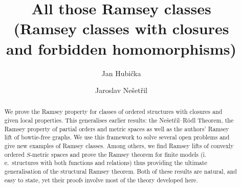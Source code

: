 \documentclass{elsarticle}
\newcommand{\ie}{i.\,e.}
\theoremstyle{plain}
\theoremstyle{definition}
\theoremstyle{remark}
\begin{document}
\begin{frontmatter}

\title{All those Ramsey classes\\
{(Ramsey classes with closures\\ and forbidden homomorphisms)}}

\author[1]{Jan Hubi\v cka%
}
\author[2]{Jaroslav Ne\v set\v ril}
\address[1]{Charles University, Faculty of Mathematics and Physics, Department of Applied Mathematics (KAM), Malostransk\' e n\' am. 25, 118 00 Praha 1, Czech Republic}
\address[2]{Charles University, Faculty of Mathematics and Physics, Computer Science Institute of Charles University (IUUK), Malostransk\' e n\' am. 25, 118 00 Praha 1, Czech Republic}



\begin{abstract}
We prove the Ramsey property for classes of ordered structures with closures
and given local properties.  This generalises earlier results: the Ne\v set\v
ril--R\"odl Theorem, the Ramsey property of partial orders and metric spaces as
well as the authors' Ramsey lift of bowtie-free graphs.  We use this framework
to solve several open problems and give new examples of Ramsey classes. Among
others, we find Ramsey lifts of convexly ordered $S$-metric spaces and prove
the Ramsey theorem for finite models (\ie{}\ structures with both functions and
relations) thus providing the ultimate generalisation of the structural Ramsey
theorem.  Both of these results are natural, and easy to state, yet  their
proofs involve most of the theory developed here.


\end{abstract}
\end{frontmatter}
\end{document}
